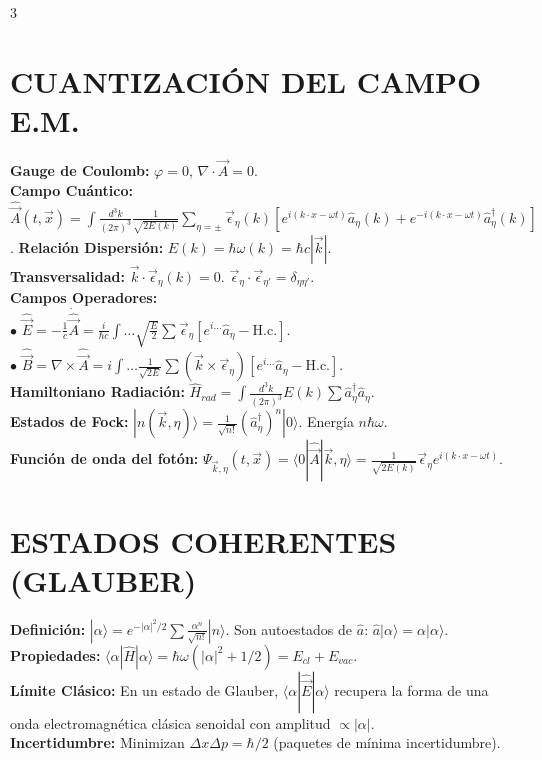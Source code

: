 \documentclass[8pt,a4paper,fleqn]{extarticle} %
\begin{document}
\begin{multicols}{3}
\section{CUANTIZACIÓN DEL CAMPO E.M.}
\textbf{Gauge de Coulomb:} $\varphi=0$, $\nabla \cdot \vec{A}=0$.\\
\textbf{Campo Cuántico:}
$\hat{\vec{A}}(t,\vec{x}) = \int \frac{d^3k}{(2\pi)^3} \frac{1}{\sqrt{2E(k)}} \sum_{\eta=\pm} \vec{\epsilon}_\eta(k) \left[ e^{i(k\cdot x - \omega t)} \hat{a}_\eta(k) + e^{-i(k\cdot x - \omega t)} \hat{a}_\eta^\dagger(k) \right]$.
\textbf{Relación Dispersión:} $E(k) = \hbar \omega(k) = \hbar c |\vec{k}|$.\\
\textbf{Transversalidad:} $\vec{k} \cdot \vec{\epsilon}_\eta(k) = 0$. $\vec{\epsilon}_\eta \cdot \vec{\epsilon}_{\eta'} = \delta_{\eta\eta'}$.
\\\textbf{Campos Operadores:}
\\$\bullet$ $\hat{\vec{E}} = -\frac{1}{c}\dot{\hat{\vec{A}}} = \frac{i}{\hbar c} \int \dots \sqrt{\frac{E}{2}} \sum \vec{\epsilon}_\eta [ e^{i\dots} \hat{a}_\eta - \text{H.c.} ]$.
\\$\bullet$ $\hat{\vec{B}} = \nabla \times \hat{\vec{A}} = i \int \dots \frac{1}{\sqrt{2E}} \sum (\vec{k} \times \vec{\epsilon}_\eta) [ e^{i\dots} \hat{a}_\eta - \text{H.c.} ]$.
\\\textbf{Hamiltoniano Radiación:} $\hat{H}_{rad} = \int \frac{d^3k}{(2\pi)^3} E(k) \sum \hat{a}_\eta^\dagger \hat{a}_\eta$.
\\\textbf{Estados de Fock:} $|n(\vec{k}, \eta)\rangle = \frac{1}{\sqrt{n!}}(\hat{a}_\eta^\dagger)^n |0\rangle$. Energía $n \hbar \omega$.
\\\textbf{Función de onda del fotón:} $\Psi_{\vec{k},\eta}(t, \vec{x}) = \langle 0 | \hat{\vec{A}} | \vec{k}, \eta \rangle = \frac{1}{\sqrt{2E(k)}} \vec{\epsilon}_\eta e^{i(k \cdot x - \omega t)}$.

\section{ESTADOS COHERENTES (GLAUBER)}
\textbf{Definición:} $|\alpha\rangle = e^{-|\alpha|^2/2} \sum \frac{\alpha^n}{\sqrt{n!}} |n\rangle$. Son autoestados de $\hat{a}$: $\hat{a}|\alpha\rangle = \alpha|\alpha\rangle$.\\\textbf{Propiedades:} $\langle \alpha | \hat{H} | \alpha \rangle = \hbar \omega (|\alpha|^2 + 1/2) = E_{cl} + E_{vac}$.
\\\textbf{Límite Clásico:} En un estado de Glauber, $\langle \alpha | \hat{\vec{E}} | \alpha \rangle$ recupera la forma de una onda electromagnética clásica senoidal con amplitud $\propto |\alpha|$.
\\\textbf{Incertidumbre:} Minimizan $\Delta x \Delta p = \hbar/2$ (paquetes de mínima incertidumbre).


\end{multicols}
\end{document}

